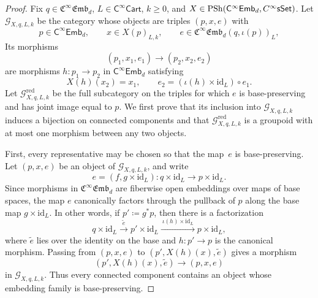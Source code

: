 \documentclass[10pt,a4paper]{amsart}
\newcommand{\Cart}{\cat{C}^{\infty}\cat{Cart}}
\newcommand{\CsSet}{\textnormal{C}^{\infty}\sset}
\newcommand{\cat}[1]{\mathsf{#1}}
\newcommand{\femb}[1]{\mathfrak{C}^{\infty}\mathfrak{Emb}_{#1}}
\newcommand{\fembnoniso}[1]{\cat{C}^{\infty}\cat{Emb}_{#1}}
\newcommand{\id}{\mathrm{id}}
\newcommand{\psh}{\mathrm{PSh}}
\newcommand{\sset}{\cat{sSet}}
\begin{document}
\begin{proof}
  Fix \(q\in \femb{d}\), \(L\in \Cart\), \(k\geq 0\), and
  \(X\in \psh(\fembnoniso{d},\CsSet)\). Let
  \(\mathcal{G}_{X,q,L,k}\) be the category whose objects are triples
  \((p,x,e)\) with
  \[
    p\in \fembnoniso{d},\qquad
    x\in X(p)_{L,k},\qquad
    e\in \femb{d}(q,\iota(p))_L,
  \]
  Its morphisms
  \[
    (p_1,x_1,e_1)\longrightarrow (p_2,x_2,e_2)
  \]
  are morphisms \(h:p_1\to p_2\) in \(\fembnoniso{d}\) satisfying
  \[
    X(h)(x_2)=x_1,
    \qquad
    e_2=(\iota(h)\times \id_L)\circ e_1.
  \]
  Let \(\mathcal{G}^{\mathrm{red}}_{X,q,L,k}\) be the full subcategory on
  the triples for which \(e\) is base-preserving and has joint image equal
  to \(p\). We first prove that its inclusion into
  \(\mathcal{G}_{X,q,L,k}\) induces a bijection on connected components and
  that \(\mathcal{G}^{\mathrm{red}}_{X,q,L,k}\) is a groupoid with at most
  one morphism between any two objects.

  First, every representative may be chosen so that the map~\(e\) is
  base-preserving. Let \((p,x,e)\) be an object of
  \(\mathcal{G}_{X,q,L,k}\), and write
  \[
    e=(f,g\times \id_L):q\times \id_L\longrightarrow p\times \id_L.
  \]
  Since morphisms in \(\femb{d}\) are fiberwise open embeddings over maps of
  base spaces, the map \(e\) canonically factors through the pullback of \(p\)
  along the base map \(g\times \id_L\). In other words, if
  \(p'\coloneqq g^{*}p\), then there is a factorization
  \[
    q\times \id_L
    \xrightarrow{\ \widetilde{e}\ }
    p'\times \id_L
    \xrightarrow{\ \iota(h)\times \id_L\ }
    p\times \id_L,
  \]
  where \(\widetilde{e}\) lies over the identity on the base and
  \(h:p'\to p\) is the canonical morphism. Passing from \((p,x,e)\) to
  \((p',X(h)(x),\widetilde{e})\) gives a morphism
  \[
    (p',X(h)(x),\widetilde{e})\longrightarrow (p,x,e)
  \]
  in \(\mathcal{G}_{X,q,L,k}\). Thus every connected component contains an
  object whose embedding family is base-preserving.


\end{proof}
\end{document}
